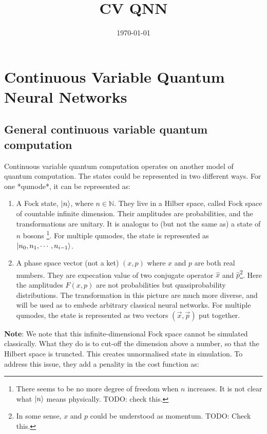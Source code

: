 \documentclass{article}
\title{CV QNN}
\date{\today}
\author{}
\begin{document}
\maketitle
{}
\tableofcontents

\section{Continuous Variable Quantum Neural Networks}

\subsection{General continuous variable quantum computation}


Continuous variable quantum computation operates on another model of quantum computation. The states could be represented in two different ways. For one *qumode*, it can be represented as:

\begin{enumerate}
  \item 
A Fock state, $\ket{n}$, where $n\in \mathbb{N}$. They live in a Hilber
space, called Fock space of countable infinite dimension. Their amplitudes are
probabilities, and the transformations are unitary. It is analogus to (but not
the same as) a state of $n$ bosons \footnote{There seems to be no more degree of freedom when $n$ increases. It is not clear what $\ket{n}$ means physically. TODO: check this.}. For multiple qumodes, the state is represented as $\ket{n_0,n_1,\cdots,n_{i-1}}$.
\item
A phase space vector (not a ket) $(x,p)$ where $x$ and $p$ are both real
numbers. They are expecation value of two conjugate operator $\hat{x}$ and
$\hat{p}$\footnote{In some sense, $x$ and $p$ could be understood as momentum. TODO: Check this.}. Here the amplitudes $F(x,p)$ are not probabilities but quasiprobability distributions. The transformation in this picture are much more diverse, and will be used as to embede arbitrary classical neural networks. For multiple qumodes, the state is represented as two vectors $(\vec{x}, \vec{p})$ put together.
\end{enumerate}

\textbf{Note}:
We note that this infinite-dimensional Fock space cannot be simulated classically. What they do is to cut-off the dimension above a number, so that the Hilbert space is truncted. This creates unnormalised state in simulation. To address this issue, they add a penality in the cost function as:
\end{document}
